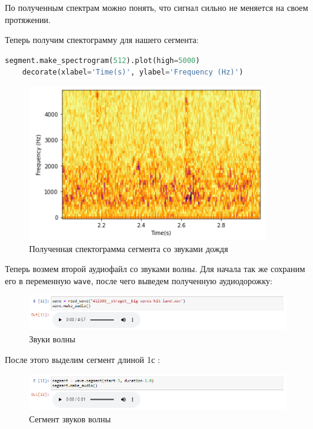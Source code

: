 \documentclass[a4paper]{article}
\begin{document}
            По полученным спектрам можно понять, что сигнал сильно не меняется на своем протяжении.
            
            Теперь получим спектограмму для нашего сегмента:
            
\begin{lstlisting}[language=Python, caption= Получение спектограммы для сегмента]
    segment.make_spectrogram(512).plot(high=5000)
    decorate(xlabel='Time(s)', ylabel='Frequency (Hz)')
\end{lstlisting}               
            
            \begin{figure}[H]
                \centering
                \includegraphics{ex_1_rain_spectogramma.png}
                \caption{Полученная спектограмма сегмента со звуками дождя}
                \label{fig:ex_1_rain_spectogramma}
            \end{figure}
            
            Теперь возмем второй аудиофайл со звуками волны. Для начала так же сохраним его в переменную \texttt{wave}, после чего выведем полученную аудиодорожку:
            
\begin{figure}[H]
                \centering
                \includegraphics[width=\textwidth]{ex_1_wave_audio.png}
                \caption{Звуки волны}
                \label{fig:ex_1_wave_audio}
            \end{figure}
            
            После этого выделим сегмент длиной 1с :
            
            \begin{figure}[H]
                \centering
                \includegraphics[width=\textwidth]{ex_1_wave_segment_audio.png}
                \caption{Сегмент звуков волны}
                \label{fig:ex_1_wave_segment_audio}
            \end{figure}
            
\end{document}
